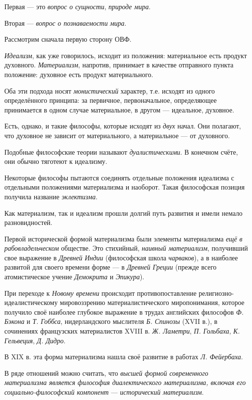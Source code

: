 \documentclass[a4paper,14pt,russian]{extreport}
\begin{document}
Первая --- это \emph{вопрос о сущности}, \emph{природе мира}.

Вторая --- \emph{вопрос о познаваемости} \emph{мира}.

Рассмотрим сначала первую сторону ОВФ.

\emph{Идеализм}, как уже говорилось, исходит из положения: материальное есть продукт духовного. \emph{Материализм}, напротив, принимает в качестве отправного пункта положение: духовное есть продукт материального.

Оба эти подхода носят \emph{монистический} характер, т.е. исходят из одного определённого принципа: за первичное, первоначальное, определяющее принимается в одном случае материальное, в другом --- идеальное, духовное.

Есть, однако, и такие философы, которые исходят из \emph{двух} начал. Они полагают, что духовное не зависит от материального, а материальное --- от духовного.

Подобные философские теории называют \emph{дуалистическими}. В конечном счёте, они обычно тяготеют к идеализму.

Некоторые философы пытаются соединять отдельные положения идеализма с отдельными положениями материализма и наоборот. Такая философская позиция получила название \emph{эклектизма}.

Как материализм, так и идеализм прошли долгий путь развития и имели немало разновидностей.

Первой исторической формой материализма были элементы материализма \emph{ещё в рабовладельческом} обществе. Это стихийный, \emph{наивный материализм}, получивший свое выражение в \emph{Древней Индии} (философская школа \emph{чарваков}), а в наиболее развитой для своего времени форме --- в \emph{Древней Греции} (прежде всего атомистическое учение \emph{Демокрита} и \emph{Эпикура}).

При переходе к \emph{Новому времени} происходит противопоставление религиозно-идеалистическому мировоззрению материалистического миропонимания, которое получило своё наиболее глубокое выражение в трудах английских философов \emph{Ф. Бэкона} и \emph{Т. Гоббса}, нидерландского мыслителя \emph{Б. Спинозы} (XVII в.), в сочинениях французских материалистов XVIII в. \emph{Ж. Ламетри}, \emph{П. Гольбаха}, \emph{К. Гельвеция}, \emph{Д. Дидро}.

В XIX в. эта форма материализма нашла своё развитие в работах \emph{Л. Фейербаха}.

В ряде отношений можно считать, что \emph{высшей формой современного материализма является философия диалектического материализма, включая его социально-философский компонент} --- \emph{исторический материализм}.
\end{document}

